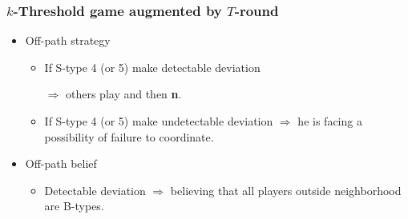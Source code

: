 \documentclass[8pt]{beamer}
\begin{document}
\begin{frame}
  \frametitle{$k$-Threshold game augmented by $T$-round }


\begin{itemize}

\item Off-path strategy
\begin{itemize}
\item If S-type 4 (or 5) make detectable deviation 

$\Rightarrow$ others play  and then \textbf{n}.
\item If S-type 4 (or 5) make undetectable deviation $\Rightarrow$ he is facing a possibility of failure to coordinate.
\end{itemize}
\item Off-path belief
\begin{itemize}
\item Detectable deviation $\Rightarrow$ believing that all players outside neighborhood are B-types. 
\end{itemize}
\end{itemize}



\end{frame}
\end{document}
